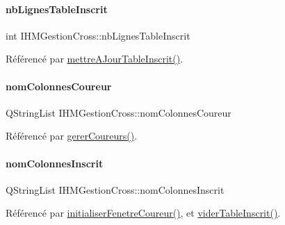 \paragraph{\texorpdfstring{nb\+Lignes\+Table\+Inscrit}{nbLignesTableInscrit}}
{\footnotesize\ttfamily int I\+H\+M\+Gestion\+Cross\+::nb\+Lignes\+Table\+Inscrit\hspace{0.3cm}{\ttfamily [private]}}



Référencé par \hyperlink{class_i_h_m_gestion_cross_a3c96fb9d92e9392ea83b380c3648bf55}{mettre\+A\+Jour\+Table\+Inscrit()}.

\mbox{\label{class_i_h_m_gestion_cross_ab95ce87fd2f9427023040cc8d0077681}} 
\paragraph{\texorpdfstring{nom\+Colonnes\+Coureur}{nomColonnesCoureur}}
{\footnotesize\ttfamily Q\+String\+List I\+H\+M\+Gestion\+Cross\+::nom\+Colonnes\+Coureur\hspace{0.3cm}{\ttfamily [private]}}



Référencé par \hyperlink{class_i_h_m_gestion_cross_ad46a2295500cf98dbc18f862f6020103}{gerer\+Coureurs()}.

\mbox{\label{class_i_h_m_gestion_cross_a94c58ce12155f117e0515ce0fc6503bc}} 
\paragraph{\texorpdfstring{nom\+Colonnes\+Inscrit}{nomColonnesInscrit}}
{\footnotesize\ttfamily Q\+String\+List I\+H\+M\+Gestion\+Cross\+::nom\+Colonnes\+Inscrit\hspace{0.3cm}{\ttfamily [private]}}



Référencé par \hyperlink{class_i_h_m_gestion_cross_aa5d9de499a66e52b843c4ef4c6074a60}{initialiser\+Fenetre\+Coureur()}, et \hyperlink{class_i_h_m_gestion_cross_ac1ca02b1cb49d9c2f60785c8bd441d60}{vider\+Table\+Inscrit()}.

